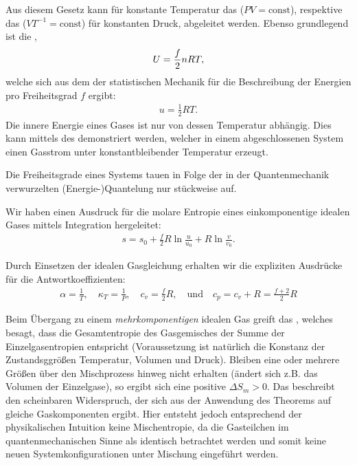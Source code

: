 \begin{summary}
    Aus diesem Gesetz kann für konstante Temperatur das  ($PV=\text{const}$), respektive das  ($VT^{-1}=\text{const}$) für konstanten Druck, abgeleitet werden.
    Ebenso grundlegend ist die ,
    \begin{align*}
        U=\frac{f}{2}n RT,
    \end{align*}
    welche sich aus dem  der statistischen Mechanik für die Beschreibung der Energien pro Freiheitsgrad $f$ ergibt:
    \begin{align*}
        u=\frac{1}{2}RT.
    \end{align*}
    Die innere Energie eines Gases ist nur von dessen Temperatur abhängig. Dies kann mittels des  demonstriert werden, welcher in einem abgeschlossenen System einen Gasstrom unter konstantbleibender Temperatur erzeugt.
    
    Die Freiheitsgrade eines Systems tauen in Folge der in der Quantenmechanik verwurzelten (Energie-)Quantelung nur stückweise auf.

    Wir haben einen Ausdruck für die molare Entropie eines einkomponentige idealen Gases mittels Integration hergeleitet:
    \begin{align*}
        s=s_0+\frac{f}{2}R\ln\frac{u}{u_0}+R\ln\frac{v}{v_0}.
    \end{align*}

    Durch Einsetzen der idealen Gasgleichung erhalten wir die expliziten Ausdrücke für die Antwortkoeffizienten:
    \begin{align*}
        \alpha=\frac{1}{T}, \quad \kappa_T=\frac{1}{P}, \quad c_v=\frac{f}{2}R, \quad\mathrm{und}\quad c_p=c_v+R=\frac{f+2}{2}R
    \end{align*}

    Beim Übergang zu einem \emph{mehrkomponentigen} idealen Gas greift das , welches besagt, dass die Gesamtentropie des Gasgemisches der Summe der Einzelgasentropien entspricht (Voraussetzung ist natürlich die Konstanz der Zustandsggrößen Temperatur, Volumen und Druck). Bleiben eine oder mehrere Größen über den Mischprozess hinweg nicht erhalten (ändert sich z.B. das Volumen der Einzelgase), so ergibt sich eine positive  $\Delta S_m>0$. Das  beschreibt den scheinbaren Widerspruch, der sich aus der Anwendung des Theorems auf gleiche Gaskomponenten ergibt. Hier entsteht jedoch \textendash{} entsprechend der physikalischen Intuition \textendash{} keine Mischentropie, da die Gasteilchen im quantenmechanischen Sinne als identisch betrachtet werden und somit keine neuen Systemkonfigurationen unter Mischung eingeführt werden.
    

\end{summary}
